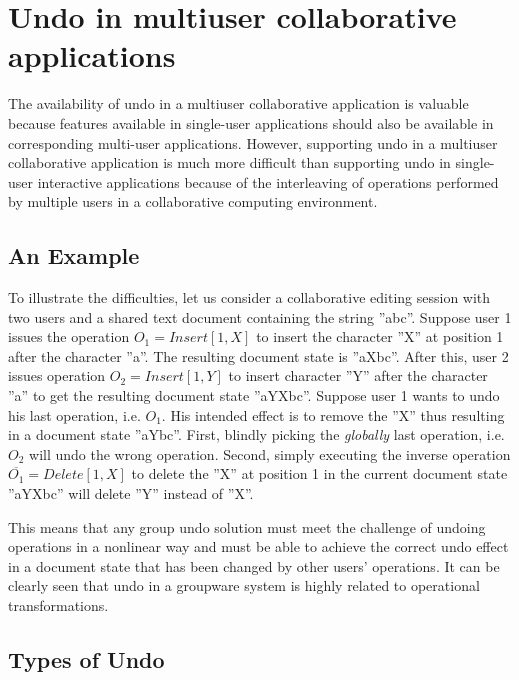 \appendix

\section{Undo in multiuser collaborative applications}
\label{sect:undo}

The availability of undo in a multiuser collaborative application is valuable because features available in single-user applications should also be available in corresponding multi-user applications. However, supporting undo in a multiuser collaborative application is much more difficult than supporting undo in single-user interactive applications because of the interleaving of operations performed by multiple users in a collaborative computing environment.


\subsection{An Example}

To illustrate the difficulties, let us consider a collaborative editing session with two users and a shared text document containing the string ''abc''. Suppose user 1 issues the operation $O_{1} = Insert[1,X]$ to insert the character ''X'' at position 1 after the character ''a''. The resulting document state is ''aXbc''. After this, user 2 issues operation $O_{2} = Insert[1,Y]$ to insert character ''Y'' after the character ''a'' to get the resulting document state ''aYXbc''. Suppose user 1 wants to undo his last operation, i.e. $O_{1}$. His intended effect is to remove the ''X'' thus resulting in a document state ''aYbc''. First, blindly picking the \emph{globally} last operation, i.e. $O_{2}$ will undo the wrong operation. Second, simply executing the inverse operation $\overline{O_{1}} = Delete[1,X]$ to delete the ''X'' at position 1 in the current document state ''aYXbc'' will delete ''Y'' instead of ''X''.

This means that any group undo solution must meet the challenge of undoing operations in a nonlinear way and must be able to achieve the correct undo effect in a document state that has been changed by other users' operations. It can be clearly seen that undo in a groupware system is highly related to operational transformations.


\subsection{Types of Undo}

